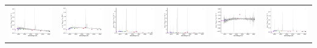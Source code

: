 \begin{center}
\begin{longtable}{l l l l l l }
    \includegraphics[width=0.3\linewidth, clip]{Figs/Figs-sdss/spec-0391-51782-0625-STRIPE82-0014-009267.pdf} & \includegraphics[width=0.3\linewidth, clip]{Figs/Figs-sdss/spec-0392-51793-0583-STRIPE82-0016-049657.pdf} & \includegraphics[width=0.3\linewidth, clip]{Figs/Figs-sdss/spec-0287-52023-0466-SPLUS-n01s25-028549.pdf} & \includegraphics[width=0.3\linewidth, clip]{Figs/Figs-sdss/spec-0330-52370-0439-SPLUS-n03s21-047308.pdf} & \includegraphics[width=0.3\linewidth, clip]{Figs/Figs-sdss/spec-0376-52143-0086-STRIPE82-0139-018589.pdf} & \includegraphics[width=0.3\linewidth, clip]{Figs/Figs-sdss/spec-0406-51817-0160-STRIPE82-0052-004127.pdf} \\

\end{longtable}
\end{center}
